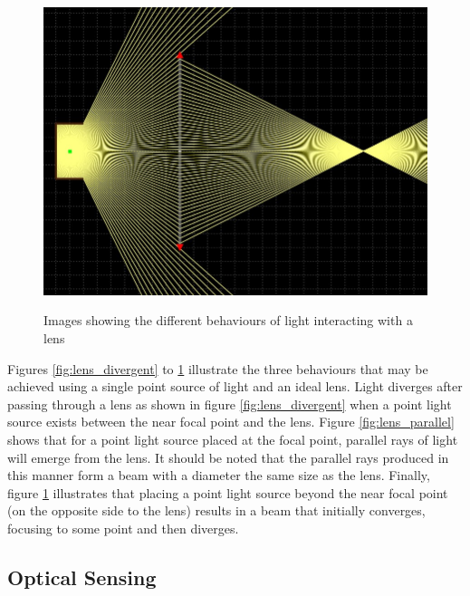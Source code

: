\begin{figure}[H]
\begin{minipage}{.3\textwidth}
		\label{fig:lens_parallel}
	\end{minipage}
	\begin{minipage}{.3\textwidth}
		\centering
		\includegraphics[width=.9\linewidth]{figures/litreview/lens_focus_beam.JPG}
		\label{fig:lens_convergent}
	\end{minipage}
	\caption*{Images showing the different behaviours of light interacting with a lens\footnotemark}
\end{figure}


Figures \ref{fig:lens_divergent} to \ref{fig:lens_convergent} illustrate the three behaviours that may be achieved using a single point source of light and an ideal lens. Light diverges after passing through a lens as shown in figure \ref{fig:lens_divergent} when a point light source exists between the near focal point and the lens. Figure \ref{fig:lens_parallel} shows that for a point light source placed at the focal point, parallel rays of light will emerge from the lens. It should be noted that the parallel rays produced in this manner form a beam with a diameter the same size as the lens. Finally, figure \ref{fig:lens_convergent} illustrates that placing a point light source beyond the near focal point (on the opposite side to the lens) results in a beam that initially converges, focusing to some point and then diverges.

\subsection{Optical Sensing}
\label{sec:optical_sensing}

